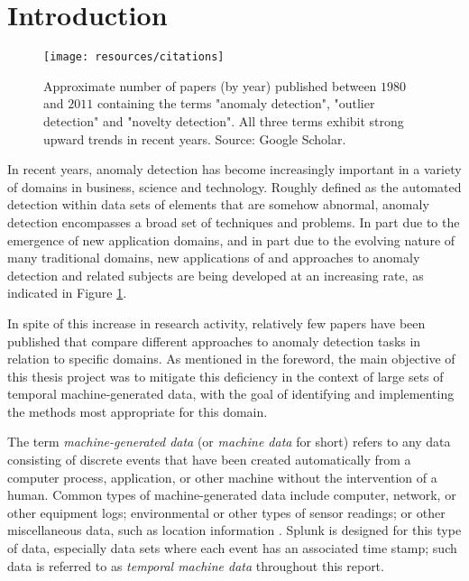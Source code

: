 \chapter*{Introduction}

\begin{figure}[htb]
    \vspace{-10pt}
    \begin{center}
        \texttt{[image: resources/citations]}
    \end{center}
    \vspace{-20pt}
    \caption{\small Approximate number of papers (by year) published between $1980$ and $2011$ containing the terms "anomaly detection", "outlier detection" and "novelty detection". All three terms exhibit strong upward trends in recent years. Source: Google Scholar.}
    \vspace{-0pt}
    \label{fig:citations}
\end{figure}

In recent years, anomaly detection has become increasingly important in a variety of domains in business, science and technology. Roughly defined as the automated detection within data sets of elements that are somehow abnormal, anomaly detection encompasses a broad set of techniques and problems. In part due to the emergence of new application domains, and in part due to the evolving nature of many traditional domains, new applications of and approaches to anomaly detection and related subjects are being developed at an increasing rate, as indicated in Figure \ref{fig:citations}.

In spite of this increase in research activity, relatively few papers have been published that compare different approaches to anomaly detection tasks in relation to specific domains. As mentioned in the foreword, the main objective of this thesis project was to mitigate this deficiency in the context of large sets of temporal machine-generated data, with the goal of identifying and implementing the methods most appropriate for this domain.

The term \emph{machine-generated data} (or \emph{machine data} for short) refers to any data consisting of discrete events that have been created automatically from a computer process, application, or other machine without the intervention of a human. Common types of machine-generated data include computer, network, or other equipment logs; environmental or other types of sensor readings; or other miscellaneous data, such as location information \cite{machine_data}. Splunk is designed for this type of data, especially data sets where each event has an associated time stamp; such data is referred to as \emph{temporal machine data} throughout this report.

